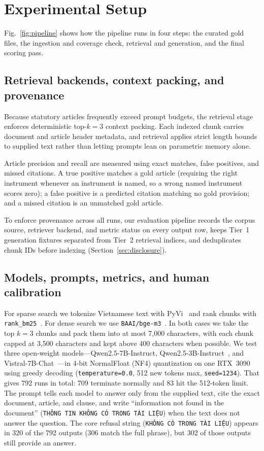 \documentclass[conference,a4paper]{IEEEtran}
\begin{document}
\section{Experimental Setup}
\label{sec:method}

Fig.~\ref{fig:pipeline} shows how the pipeline runs in four steps: the curated gold files, the ingestion and coverage check, retrieval and generation, and the final scoring pass.

\subsection{Retrieval backends, context packing, and provenance}
Because statutory articles frequently exceed prompt budgets, the retrieval stage enforces deterministic top-$k{=}3$ context packing. Each indexed chunk carries document and article header metadata, and retrieval applies strict length bounds to supplied text rather than letting prompts lean on parametric memory alone.

Article precision and recall are measured using exact matches, false positives, and missed citations. A true positive matches a gold article (requiring the right instrument whenever an instrument is named, so a wrong named instrument scores zero); a false positive is a predicted citation matching no gold provision; and a missed citation is an unmatched gold article.

To enforce provenance across all runs, our evaluation pipeline records the corpus source, retriever backend, and metric status on every output row, keeps Tier~1 generation fixtures separated from Tier~2 retrieval indices, and deduplicates chunk IDs before indexing (Section~\ref{sec:disclosure}).

\subsection{Models, prompts, metrics, and human calibration}
For sparse search we tokenize Vietnamese text with PyVi~\cite{pyvi} and rank chunks with \texttt{rank\_bm25}~\cite{robertson2009bm25,rankbm25}. For dense search we use \texttt{BAAI/bge-m3}~\cite{chen2024m3}. In both cases we take the top $k{=}3$ chunks and pack them into at most 7,000 characters, with each chunk capped at 3,500 characters and kept above 400 characters when possible. We test three open-weight models---Qwen2.5-7B-Instruct, Qwen2.5-3B-Instruct~\cite{yang2024qwen25}, and Vistral-7B-Chat~\cite{nguyen2023vistral}---in 4-bit NormalFloat (NF4) quantization on one RTX~3090 using greedy decoding (\texttt{temperature=0.0}, 512 new tokens max, \texttt{seed=1234}). That gives 792 runs in total: 709 terminate normally and 83 hit the 512-token limit. The prompt tells each model to answer only from the supplied text, cite the exact document, article, and clause, and write ``information not found in the document'' (\texttt{THÔNG~TIN KHÔNG~CÓ TRONG TÀI~LIỆU}) when the text does not answer the question. The core refusal string (\texttt{KHÔNG~CÓ TRONG TÀI~LIỆU}) appears in 320 of the 792 outputs (306 match the full phrase), but 302 of those outputs still provide an answer.
\end{document}
